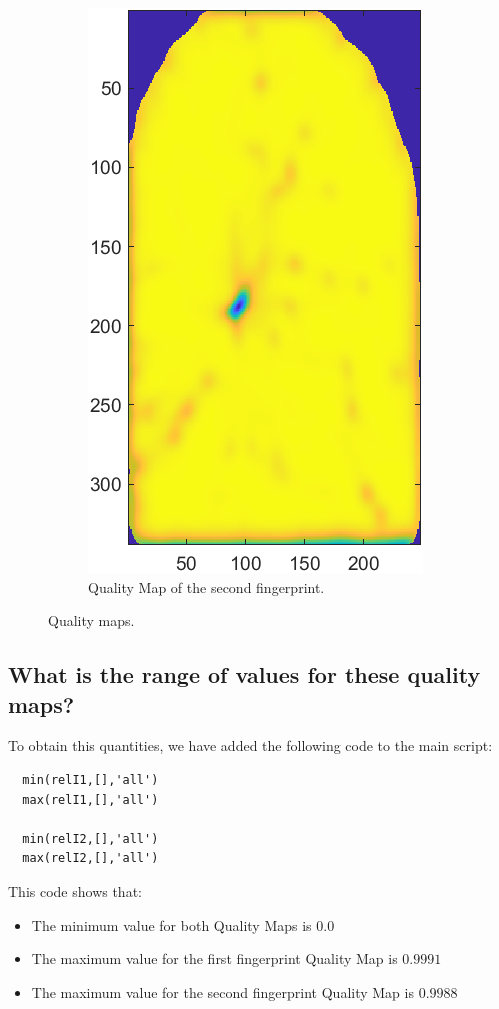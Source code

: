 \documentclass[a4paper]{article}
\begin{document}
\begin{figure}[H]
\begin{subfigure}[t]{0.45\textwidth}
         \includegraphics[scale=0.6]{Figures/QMap2}
         \caption{Quality Map of the second fingerprint.}
     \end{subfigure}
    \caption{Quality maps.}
    \label{fig:ex3a}
\end{figure}


\subsection{ What is the range of values for these quality maps?}

To obtain this quantities, we have added the following code to the main script: 

\begin{verbatim}
  min(relI1,[],'all')
  max(relI1,[],'all')
  
  min(relI2,[],'all')
  max(relI2,[],'all')
\end{verbatim}

This code shows that:

\begin{itemize}
  \item The minimum value for both Quality Maps is \(0.0\)
  \item The maximum value for the first fingerprint Quality Map is \(0.9991\)
  \item The maximum value for the second fingerprint Quality Map is \(0.9988\)
\end{itemize}
\end{document}
